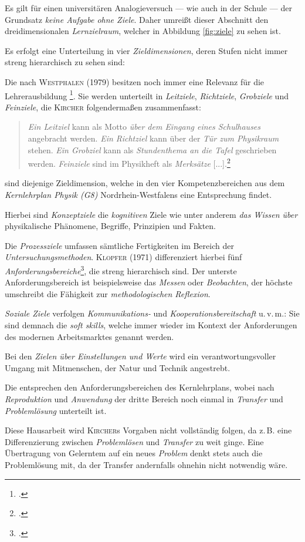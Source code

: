 Es gilt für einen universitären Analogieversuch --- wie auch in der Schule --- der Grundsatz \textit{keine Aufgabe ohne Ziele}. Daher umreißt dieser Abschnitt den dreidimensionalen \textit{Lernzielraum}, welcher in Abbildung \ref{fig:ziele} zu sehen ist.

Es erfolgt eine Unterteilung in vier \textit{Zieldimensionen}, deren Stufen nicht immer streng hierarchisch zu sehen sind:
\begin{items}
\item Die  nach \textsc{Westphalen} (1979) besitzen noch immer eine Relevanz für die Lehrerausbildung \footcite[vgl.][S.\,84]{Kircher2013}. Sie werden unterteilt in \textit{Leitziele}, \textit{Richtziele}, \textit{Grobziele} und  \textit{Feinziele}, die \textsc{Kircher} folgendermaßen zusammenfasst:
\begin{quote}
\textit{Ein Leitziel} kann als Motto \textit{über dem Eingang eines Schulhauses} angebracht werden. \textit{Ein Richtziel} kann über der \textit{Tür zum Physikraum} stehen. \textit{Ein Grobziel} kann als \textit{Stundenthema an die Tafel} geschrieben werden. \textit{Feinziele} sind im Physikheft als \textit{Merksätze} [...].\footcite[S.\,87]{Kircher2013}
\end{quote}
\item {} sind diejenige Zieldimension, welche in den vier Kompetenzbereichen aus dem \textit{Kernlehrplan Physik (G8)} Nordrhein-Westfalens eine Entsprechung findet.

Hierbei sind \textit{Konzeptziele} die \textit{kognitiven} Ziele wie unter anderem \textit{das Wissen über} physikalische Phänomene, Begriffe, Prinzipien und Fakten.

Die \textit{Prozessziele} umfassen sämtliche Fertigkeiten im Bereich der \textit{Untersuchungsmethoden}. \textsc{Klopfer} (1971) differenziert hierbei fünf \textit{Anforderungsbereiche}\footcite[vgl.][S.\,90]{Kircher2013}, die streng hierarchisch sind. Der unterste Anforderungsbereich ist beispielsweise das \textit{Messen} oder \textit{Beobachten}, der höchste umschreibt die Fähigkeit zur \textit{methodologischen Reflexion}.

\textit{Soziale Ziele} verfolgen \textit{Kommunikations-} und \textit{Kooperationsbereitschaft} u.\,v.\,m.: Sie sind demnach die \textit{soft skills}, welche immer wieder im Kontext der Anforderungen des modernen Arbeitsmarktes genannt werden.

Bei den \textit{Zielen über Einstellungen und Werte} wird ein verantwortungsvoller Umgang mit Mitmenschen, der Natur und Technik angestrebt.
\item Die  entsprechen den Anforderungsbereichen des Kernlehrplans, wobei nach \textit{Reproduktion} und \textit{Anwendung} der dritte Bereich noch einmal in \textit{Transfer} und \textit{Problemlösung} unterteilt ist.
\end{items}
Diese Hausarbeit wird \textsc{Kircher}s Vorgaben nicht vollständig folgen, da z.\,B. eine Differenzierung zwischen \textit{Problemlösen} und \textit{Transfer} zu weit ginge. Eine Übertragung von Gelerntem auf ein neues \textit{Problem} denkt stets auch die Problemlösung mit, da der Transfer andernfalls ohnehin nicht notwendig wäre. 

